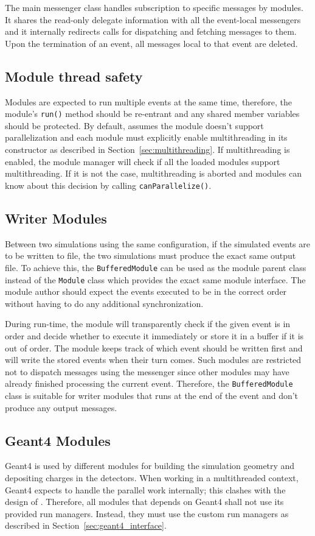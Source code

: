 The main messenger class handles subscription to specific messages by modules.
It shares the read-only delegate information with all the event-local messengers and it internally redirects calls for dispatching and fetching messages to them.
Upon the termination of an event, all messages local to that event are deleted.

\subsection{Module thread safety}
Modules are expected to run multiple events at the same time, therefore, the module's \texttt{run()} method should be re-entrant and any shared member variables should be protected.
By default, \apsq assumes the module doesn't support parallelization and each module must explicitly enable multithreading in its constructor as described in Section~\ref{sec:multithreading}.
If multithreading is enabled, the module manager will check if all the loaded modules support multithreading.
If it is not the case, multithreading is aborted and modules can know about this decision by calling \texttt{canParallelize()}.

\subsection{Writer Modules}
Between two simulations using the same configuration, if the simulated events are to be written to file, the two simulations must produce the exact same output file.
To achieve this, the \texttt{BufferedModule} can be used as the module parent class instead of the \texttt{Module} class which provides the exact same module interface.
The module author should expect the events executed to be in the correct order without having to do any additional synchronization.

During run-time, the module will transparently check if the given event is in order and decide whether to execute it immediately or store it in a buffer if it is out of order.
The module keeps track of which event should be written first and will write the stored events when their turn comes.
Such modules are restricted not to dispatch messages using the messenger since other modules may have already finished processing the current event.
Therefore, the \texttt{BufferedModule} class is suitable for writer modules that runs at the end of the event and don't produce any output messages.

\subsection{Geant4 Modules}
Geant4 is used by different modules for building the simulation geometry and depositing charges in the detectors.
When working in a multithreaded context, Geant4 expects to handle the parallel work internally; this clashes with the design of \apsq.
Therefore, all modules that depends on Geant4 shall not use its provided run managers.
Instead, they must use the custom run managers as described in Section~\ref{sec:geant4_interface}.

